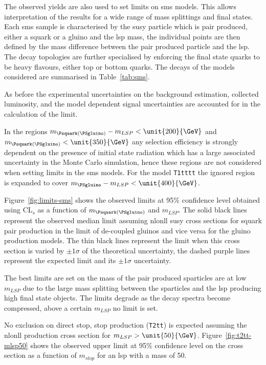 The observed yields are also used to set limits on \ac{sms} models. This allows 
interpretation of the results for a wide range of mass splittings and final 
states. Each \ac{sms} sample is characterised by the \ac{susy} particle which 
is pair produced, either a squark or a gluino and the \ac{lsp} mass, the 
individual points are then defined by the mass difference between the pair 
produced particle and the \ac{lsp}.
The decay topologies are further specialised by enforcing the final state 
quarks to be heavy flavours, either top or bottom quarks. The decays of the 
models considered are summarised in Table~\ref{tab:sms}.

As before the experimental uncertainties on the background estimation, 
collected luminosity, and the model dependent  signal uncertainties are 
accounted for in the calculation of the limit.

In the regions $m_{\Psquark(\PSgluino)} - m_{LSP} < \unit{200}{\GeV}$ and 
$m_{\Psquark(\PSgluino)} < \unit{350}{\GeV}$ any selection efficiency is 
strongly dependent  on the presence of initial state radiation which has a large associated uncertainty in the Monte Carlo simulation, hence these regions are not considered when setting limits in the \ac{sms} models. For the model 
\texttt{T1tttt} the ignored region is expanded to cover $m_{\PSgluino} - 
m_{LSP} < \unit{400}{\GeV}$. 

Figure~\ref{fig:limits-sms} shows the observed limits at 95$\%$ confidence level obtained using CL$_{s}$ as a function of $m_{\Psquark(\PSgluino)}$ and $m_{LSP}$. The solid black lines represent the observed median limit assuming \ac{nlonll} \ac{susy} cross sections for squark pair production in the limit of de-coupled gluinos and vice versa for the gluino production models. The thin black lines represent the limit when this cross section is varied by $\pm1\sigma$ of the theoretical uncertainty, the dashed purple lines represent the expected limit and its $\pm1\sigma$ uncertainty.

The best limits are set on the mass of the pair produced sparticles are at low $m_{LSP}$ due to the large mass splitting between the sparticles and the \ac{lsp} producing high \pt final state objects. The limits degrade as the decay spectra become compressed, above a certain $m_{LSP}$ no limit is set.

No exclusion on direct stop, stop production (\texttt{T2tt}) is expected assuming the \ac{nlonll} production cross section for $m_{LSP} > \unit{50}{\GeV}$. Figure~\ref{fig:t2tt-mlsp50} shows the observed upper limit at 95$\%$ confidence level on the cross section as a function of $m_{stop}$ for an \ac{lsp} with a mass of \unit{50}{\GeV}.


